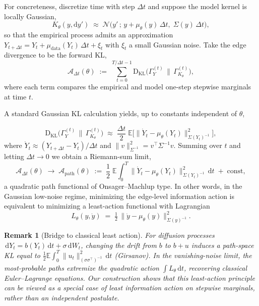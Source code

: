 \documentclass[11pt]{article}
\newtheorem{remark}{Remark}
\newcommand{\E}{\mathbb{E}}
\newcommand{\KL}{\mathrm{D}_{\mathrm{KL}}}
\newcommand{\1}{\mathbf{1}}
\begin{document}
For concreteness, discretize time with step $\Delta t$ and suppose the model kernel is locally Gaussian,
\[
	K_\theta(y,\mathrm dy')
	\;\approx\;
	\mathcal N\!\big(
	y' \,;\,
	y + \mu_\theta(y)\,\Delta t,\;
	\Sigma(y)\,\Delta t
	\big),
\]
so that the empirical process admits an approximation
\(
	Y_{t+\Delta t} = Y_t + \mu_{\text{data}}(Y_t)\,\Delta t + \xi_t
\)
with $\xi_t$ a small Gaussian noise. Take the edge divergence to be the forward KL,
\[
	\mathcal A_{\Delta t}(\theta)
	\;:=\;
	\sum_{t=0}^{T/\Delta t -1}
	\KL\big(
  	\Gamma_Y^{(t)}
  	\,\big\|\,
  	\Gamma_{K_\theta}^{(t)}
	\big),
\]
where each term compares the empirical and model one-step stepwise marginals at time $t$.

A standard Gaussian KL calculation yields, up to constants independent of $\theta$,

\[
	\KL\big(
 	\Gamma_Y^{(t)}
  	\,\big\|\,
  	\Gamma_{K_\theta}^{(t)}
	\big)
	\;\approx\;
	\frac{\Delta t}{2}\;
	\E\Big[
  	\big\|
   	\dot Y_t - \mu_\theta(Y_t)
  	\big\|^2_{\Sigma(Y_t)^{-1}}
	\Big],
\]
where $\dot Y_t \approx (Y_{t+\Delta t}-Y_t)/\Delta t$ and $\|v\|^2_{\Sigma^{-1}} = v^\top \Sigma^{-1} v$. Summing over $t$ and letting $\Delta t\to 0$ we obtain a Riemann-sum limit,
\[
	\mathcal A_{\Delta t}(\theta)
	\;\to\;
	\mathcal A_{\mathrm{path}}(\theta)
	\;:=\;	
	\frac12\;
	\E\!\int_0^T
 	\big\|
    	\dot Y_t - \mu_\theta(Y_t)
  	\big\|^2_{\Sigma(Y_t)^{-1}}
	\,\mathrm dt
	\;+\;\text{const},
\]
a quadratic path functional of Onsager--Machlup type. In other words, in the Gaussian low-noise regime, minimizing the edge-level information action is equivalent to minimizing a least-action functional with Lagrangian
\[
	L_\theta(y,\dot y)
	\;=\;
	\tfrac12\,\big\| \dot y - \mu_\theta(y) \big\|^2_{\Sigma(y)^{-1}}.
\]

\begin{remark}[Bridge to classical least action]
For diffusion processes $\,\mathrm dY_t = b(Y_t)\,\mathrm dt + \sigma\,\mathrm dW_t$, changing the drift from $b$ to $b+u$ induces a path-space KL equal to $\tfrac12\E\int_0^T \|u_t\|^2_{(\sigma\sigma^\top)^{-1}}\,\mathrm dt$ (Girsanov). In the vanishing-noise limit, the most-probable paths extremize the quadratic action $\int L_\theta\,\mathrm dt$, recovering classical Euler--Lagrange equations. Our construction shows that this least-action principle can be viewed as a special case of least \emph{information} action on stepwise marginals, rather than an independent postulate.
\end{remark}

\end{document}
